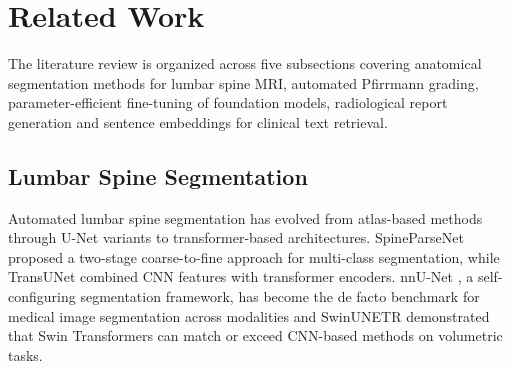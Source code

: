 \documentclass[journal]{IEEEtran}
\begin{document}
\section{Related Work}
\label{sec:related}

The literature review is organized across five subsections covering anatomical segmentation methods for lumbar spine MRI, automated Pfirrmann grading, parameter-efficient fine-tuning of foundation models, radiological report generation and sentence embeddings for clinical text retrieval.

\subsection{Lumbar Spine Segmentation}
Automated lumbar spine segmentation has evolved from atlas-based methods \cite{zukic2014robust} through U-Net variants \cite{ronneberger2015unet} to transformer-based architectures.
SpineParseNet \cite{pang2021spineparsenet} proposed a two-stage coarse-to-fine approach for multi-class segmentation, while TransUNet \cite{chen2021transunet} combined CNN features with transformer encoders.
nnU-Net \cite{isensee2021nnu}, a self-configuring segmentation framework, has become the de facto benchmark for medical image segmentation across modalities and SwinUNETR \cite{hatamizadeh2022swinunetr} demonstrated that Swin Transformers can match or exceed CNN-based methods on volumetric tasks.
\end{document}
